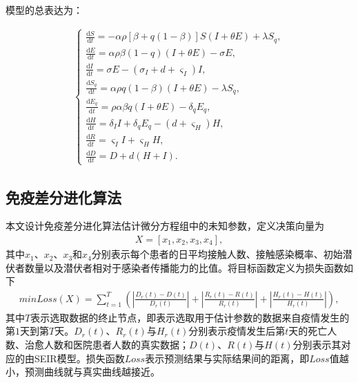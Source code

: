 \documentclass{whutmod}
\begin{document}
			模型的总表达为：
			\begin{spacing}{2}
			\begin{gather}
			\left\{\begin{array}{l}
			\frac{\mathrm{d} S}{\mathrm{d} t}=-\alpha\rho [\beta +q(1-\beta)]S(I+\theta E)+\lambda S_{q},
			\\ \frac{\mathrm{d} E}{\mathrm{d} t}=\alpha\rho\beta(1-q) (I+\theta E)-\sigma E,
			\\ \frac{\mathrm{d} I}{\mathrm{d} t}=\sigma E-(\sigma_I+d+\varsigma_I)I,
			\\ \frac{\mathrm{d} S_q}{\mathrm{d} t}=\alpha\rho q(1-\beta)(I+\theta E)-\lambda S_q,
			\\ \frac{\mathrm{d} E_q}{\mathrm{d} t}=\rho \alpha \beta q(I+\theta E)-\delta_q E_q,
			\\ \frac{\mathrm{d}H }{\mathrm{d} t}=\delta_I I+ \delta_q E_q-(d+\varsigma_H )H,
			\\ \frac{\mathrm{d} R}{\mathrm{d} t}=\varsigma_I I+\varsigma_H H,
			\\\frac{\mathrm{d} D}{\mathrm{d} t}= D + d(H+I).
			\end{array}\right.
			\end{gather}
			\end{spacing}
		\subsection{免疫差分进化算法}
		本文设计免疫差分进化算法估计微分方程组中的未知参数，定义决策向量为
		\begin{gather}
		X=[x_1,x_2,x_3,x_4],
		\end{gather}
		其中$x_1$、$x_2$、$x_3$和$x_4$分别表示每个患者的日平均接触人数、接触感染概率、初始潜伏者数量以及潜伏者相对于感染者传播能力的比值。将目标函数定义为损失函数如下
		\begin{gather}
		min Loss(X)=\sum_{t=1}^T (|\frac{D_r(t)-D(t)}{D_r(t)}|+|\frac{R_r(t)-R(t)}{R_r(t)}|+|\frac{H_r(t)-H(t)}{H_r(t)}|),
		\end{gather}
		其中$T$表示选取数据的终止节点，即表示选取用于估计参数的数据来自疫情发生的第$1$天到第$T$天。$D_r(t)$、$R_r(t)$与$H_r(t)$分别表示疫情发生后第$t$天的死亡人数、治愈人数和医院患者人数的真实数据；$D(t)$、$R(t)$与$H(t)$分别表示其对应的由SEIR模型。损失函数$Loss$表示预测结果与实际结果间的距离，即$Loss$值越小，预测曲线就与真实曲线越接近。
\end{document}
